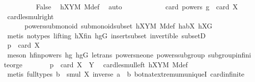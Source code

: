 \begin{isabellebody}
\ \ \ \ \ \ \isamarkupfalse%
\ \isamarkupfalse%
\ False\ \isamarkupfalse%
\ hXYM\ M{\isacharunderscore}{\kern0pt}def\ \isamarkupfalse%
\ auto\isanewline
\ \ \ \ \isamarkupfalse%
\isanewline
\ \ \ \ \isamarkupfalse%
\ \isamarkupfalse%
\ {\isachardoublequoteopen}card\ {\isacharparenleft}{\kern0pt}powers\ g{\isacharparenright}{\kern0pt}\ {\isasymle}\ card\ X{\isachardoublequoteclose}\ \isamarkupfalse%
\ card{\isacharunderscore}{\kern0pt}le{\isacharunderscore}{\kern0pt}smul{\isacharunderscore}{\kern0pt}right\ \isanewline
\ \ \ \ \ \ powers{\isacharunderscore}{\kern0pt}submonoid\ submonoid{\isachardot}{\kern0pt}subset\ hXYM\ M{\isacharunderscore}{\kern0pt}def\ habX\ hXG\ \isanewline
\ \ \ \ \ \ \isamarkupfalse%
\ {\isacharparenleft}{\kern0pt}metis\ {\isacharparenleft}{\kern0pt}no{\isacharunderscore}{\kern0pt}types{\isacharcomma}{\kern0pt}\ lifting{\isacharparenright}{\kern0pt}\ hXfin\ hgG\ insert{\isacharunderscore}{\kern0pt}subset\ invertible\ subsetD{\isacharparenright}{\kern0pt}\isanewline
\ \ \ \ \isamarkupfalse%
\ \isamarkupfalse%
\ {\isachardoublequoteopen}p\ {\isasymle}\ card\ X{\isachardoublequoteclose}\ \isanewline
\ \ \ \ \ \ \isamarkupfalse%
\ {\isacharparenleft}{\kern0pt}meson\ hfinpowers\ hg{}\ hgG\ le{\isacharunderscore}{\kern0pt}trans\ powers{\isacharunderscore}{\kern0pt}ne{\isacharunderscore}{\kern0pt}one\ powers{\isacharunderscore}{\kern0pt}subgroup\ subgroup{\isacharunderscore}{\kern0pt}infinite{\isacharunderscore}{\kern0pt}or{\isacharunderscore}{\kern0pt}ge{\isacharparenright}{\kern0pt}\isanewline
\ \ \ \ \isamarkupfalse%
\ \isamarkupfalse%
\ {\isachardoublequoteopen}p\ {\isasymle}\ card\ {\isacharparenleft}{\kern0pt}X\ {\isasymcdots}\ Y{\isacharparenright}{\kern0pt}{\isachardoublequoteclose}\ \isamarkupfalse%
\ card{\isacharunderscore}{\kern0pt}le{\isacharunderscore}{\kern0pt}smul{\isacharunderscore}{\kern0pt}left\ hXYM\ M{\isacharunderscore}{\kern0pt}def\ \isanewline
\ \ \ \ \ \ \isamarkupfalse%
\ {\isacharparenleft}{\kern0pt}metis\ {\isacharparenleft}{\kern0pt}full{\isacharunderscore}{\kern0pt}types{\isacharparenright}{\kern0pt}\ {\isacartoucheopen}b\ {\isasymin}\ smul\ X\ {\isacharbraceleft}{\kern0pt}inverse\ a\ {\isasymcdot}\ b{\isacharbraceright}{\kern0pt}{\isacartoucheclose}\ bot{\isacharunderscore}{\kern0pt}nat{\isacharunderscore}{\kern0pt}{}{\isachardot}{\kern0pt}extremum{\isacharunderscore}{\kern0pt}uniqueI\ card{\isachardot}{\kern0pt}infinite\ \isanewline

\end{isabellebody}
